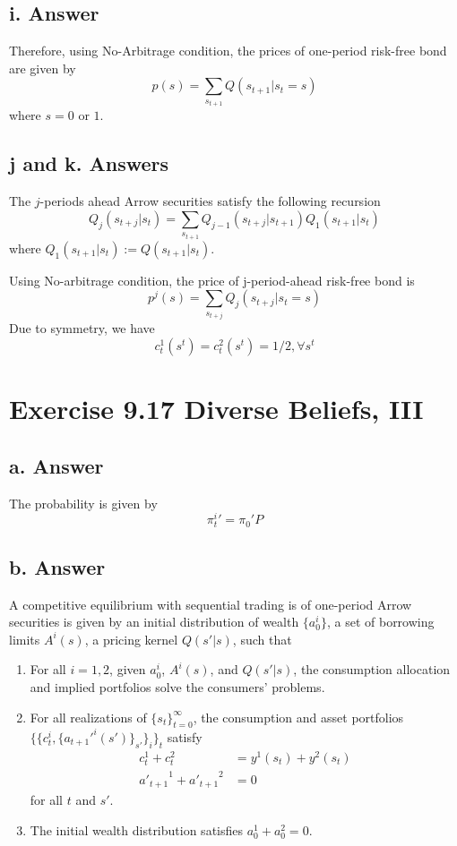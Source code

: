 \documentclass[11pt]{article}
\theoremstyle{definition}
\theoremstyle{boldtitle} %
\numberwithin{equation}{section}
\numberwithin{figure}{section}
\numberwithin{table}{section}
\begin{document}
\subsection{i. Answer} 
Therefore, using No-Arbitrage condition, 
the prices of one-period risk-free bond are given by 
\[
p(s) = \sum_{s_{t+1}} Q(s_{t+1}|s_t = s)
\]
where $s = 0$ or $1$.

\subsection{j and k. Answers} 
The $j$-periods ahead Arrow securities satisfy the following recursion 
\[
Q_j(s_{t+j}|s_t) = \sum_{s_{t+1}} Q_{j-1}(s_{t+j}|s_{t+1}) Q_1(s_{t+1}|s_t)
\]
where $Q_1(s_{t+1}|s_t) := Q(s_{t+1}|s_t)$.

Using No-arbitrage condition, the price of j-period-ahead risk-free bond is 
\[
p^j(s) = \sum_{s_{t+j}} Q_j(s_{t+j}|s_t = s)
\]
Due to symmetry, we have 
\[
c^1_t(s^t) = c^2_t(s^t) = 1/2, \forall s^t
\]


\section{Exercise 9.17 Diverse Beliefs, III}
\subsection{a. Answer} 
The probability is given by 
\[
{\pi_t^i}' = \pi_0' P
\]

\subsection{b. Answer} 
A competitive equilibrium with sequential trading is of one-period Arrow securities 
is given by
an initial distribution of wealth $\{a_0^i\}$, 
a set of borrowing limits $A^i(s)$, 
a pricing kernel $Q(s'|s)$, 
such that 
\begin{enumerate}
    \item For all $i = 1, 2$, given $a^i_0$, $A^i(s)$, and $Q(s'|s)$, the consumption allocation and implied portfolios solve the consumers' problems.
    \item For all realizations of $\{s_t \}_{t=0}^\infty$, the consumption and asset portfolios $\{ \{c^i_t, \{{{a_{t+1}'}^i}(s')\}_{s'} \}_i\}_t$ 
    satisfy 
    \begin{align*}
        c^1_t + c^2_t & = y^1(s_t) + y^2(s_t) \\
        {a'_{t+1}}^1 + {a'_{t+1}}^2 & = 0
    \end{align*}
    for all $t$ and $s'$.
    \item The initial wealth distribution satisfies $a_0^1 + a_0^2 = 0$.
\end{enumerate}
\end{document}
